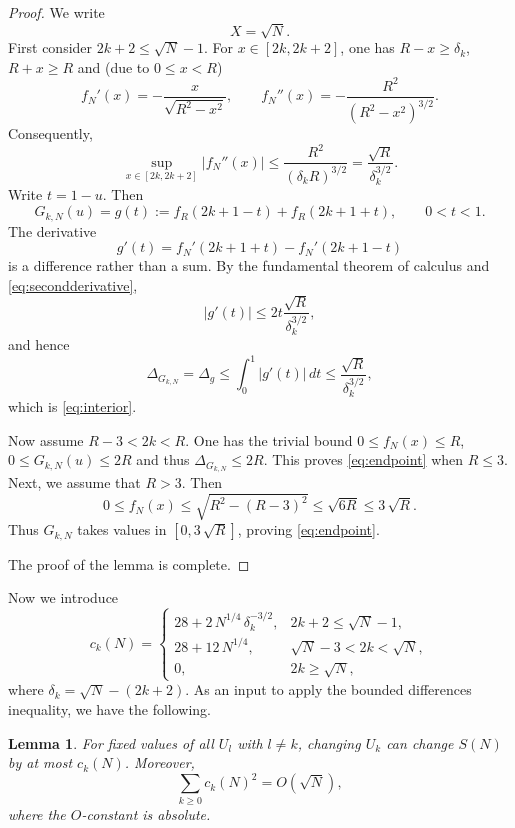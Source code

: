 \documentclass[12pt,reqno]{amsart}
\theoremstyle{plain}
\newtheorem{lemma}{Lemma}[section]
\theoremstyle{definition}
\begin{document}
\begin{proof}We write 
$$X=\sqrt{N}.$$
First consider $2k+2\le \sqrt{N}-1$. 
For $x\in[2k,2k+2]$, one has $R-x\ge \delta_k$, $R+x\ge R$ and (due to $0\le x<R$)
\begin{equation*}
 f_N'(x)=-\frac{x}{\sqrt{R^2-x^2}},\qquad
 f_N''(x)=-\frac{R^2}{(R^2-x^2)^{3/2}}.
\end{equation*}
Consequently,
\begin{equation}\label{eq:secondderivative}
 \sup_{x\in[2k,2k+2]}|f_N''(x)|
 \le\frac{R^2}{(\delta_kR)^{3/2}}
 =\frac{\sqrt R}{\delta_k^{3/2}}.
\end{equation}
Write $t=1-u$. Then
\[
 G_{k,N}(u)=g(t):=f_R(2k+1-t)+f_R(2k+1+t),\qquad0<t<1.
\]
The derivative
\[
 g'(t)=f_N'(2k+1+t)-f_N'(2k+1-t)
\]
is a difference rather than a sum.
By the fundamental theorem of calculus and
\eqref{eq:secondderivative}, 
$$|g'(t)|\le2t\frac{\sqrt R}{\delta_k^{3/2}},$$
and  hence
\[
 \Delta_{ G_{k,N}}=\Delta_{g}
 \le\int_0^1|g'(t)|\,dt\le \frac{\sqrt R}{\delta_k^{3/2}},
\]
which is \eqref{eq:interior}.

Now assume $R-3<2k<R$. One has the trivial bound $0\le f_N(x)\le R$, $0\le G_{k,N}(u)\le 2R$ and thus $\Delta_{G_{k,N}}\le 2R$. This proves \eqref{eq:endpoint} when $R\le 3$. Next, we assume that $R>3$. Then
\[
 0\le f_N(x)\le\sqrt{R^2-(R-3)^2}\le\sqrt{6R}\le 3\,\sqrt{R}.
\]
Thus $G_{k,N}$ takes values in $[0,3\,\sqrt{R}]$, proving
\eqref{eq:endpoint}.

The proof of the lemma is complete.
\end{proof}
Now we introduce 
\begin{equation*}
 c_k(N)=
 \begin{cases}
  28+2\,N^{1/4}\,\delta_k^{-3/2},
       &2k+2\le \sqrt{N}-1,\\[2pt]
  28+12\,N^{1/4},&\sqrt{N}-3<2k<\sqrt{N},\\[2pt]
  0,&2k\ge \sqrt{N},
 \end{cases}
\end{equation*}
where 
$\delta_k=\sqrt{N}-(2k+2)$. As an input to apply the bounded differences inequality, we have the following.
\begin{lemma}\label{lem:square-sum}For fixed values of all $U_l$ with $l\ne k$, changing $U_k$ can change
$S(N)$ by at most $c_k(N)$. Moreover,
\begin{equation}\label{eq:square-sum}
 \sum_{k\ge0}c_k(N)^2=O(\sqrt{N}),
\end{equation}
where the $O$-constant is absolute.
\end{lemma}
\end{document}
